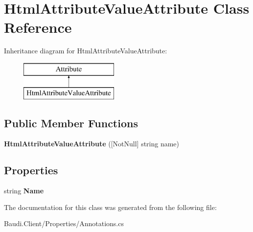 \hypertarget{class_html_attribute_value_attribute}{}\section{Html\+Attribute\+Value\+Attribute Class Reference}
\label{class_html_attribute_value_attribute}
Inheritance diagram for Html\+Attribute\+Value\+Attribute\+:\begin{figure}[H]
\begin{center}
\leavevmode
\includegraphics[height=2.000000cm]{class_html_attribute_value_attribute}
\end{center}
\end{figure}
\subsection*{Public Member Functions}
\begin{DoxyCompactItemize}
\item 
\hypertarget{class_html_attribute_value_attribute_a24f0c95d001e3e601263186ca45098a4}{}{\bfseries Html\+Attribute\+Value\+Attribute} (\mbox{[}Not\+Null\mbox{]} string name)\label{class_html_attribute_value_attribute_a24f0c95d001e3e601263186ca45098a4}

\end{DoxyCompactItemize}
\subsection*{Properties}
\begin{DoxyCompactItemize}
\item 
\hypertarget{class_html_attribute_value_attribute_ae46f5471839e8bf67fe5177f2b01e514}{}string {\bfseries Name}\label{class_html_attribute_value_attribute_ae46f5471839e8bf67fe5177f2b01e514}

\end{DoxyCompactItemize}


The documentation for this class was generated from the following file\+:\begin{DoxyCompactItemize}
\item 
Baudi.\+Client/\+Properties/Annotations.\+cs\end{DoxyCompactItemize}

